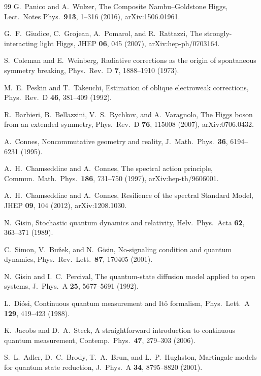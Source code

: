 \documentclass[aps,pra,onecolumn,superscriptaddress,nofootinbib,10pt]{revtex4-2}
\theoremstyle{definition}
\theoremstyle{remark}
\begin{document}
\begin{thebibliography}{99}
 G.~Panico and A.~Wulzer, The Composite Nambu--Goldstone Higgs, Lect.\ Notes Phys.\ \textbf{913}, 1--316 (2016), arXiv:1506.01961.

 G.~F.~Giudice, C.~Grojean, A.~Pomarol, and R.~Rattazzi, The strongly-interacting light Higgs, JHEP \textbf{06}, 045 (2007), arXiv:hep-ph/0703164.

 S.~Coleman and E.~Weinberg, Radiative corrections as the origin of spontaneous symmetry breaking, Phys.\ Rev.\ D \textbf{7}, 1888--1910 (1973).

 M.~E.~Peskin and T.~Takeuchi, Estimation of oblique electroweak corrections, Phys.\ Rev.\ D \textbf{46}, 381--409 (1992).

 R.~Barbieri, B.~Bellazzini, V.~S.~Rychkov, and A.~Varagnolo, The Higgs boson from an extended symmetry, Phys.\ Rev.\ D \textbf{76}, 115008 (2007), arXiv:0706.0432.

 A.~Connes, Noncommutative geometry and reality, J.\ Math.\ Phys.\ \textbf{36}, 6194--6231 (1995).

 A.~H.~Chamseddine and A.~Connes, The spectral action principle, Commun.\ Math.\ Phys.\ \textbf{186}, 731--750 (1997), arXiv:hep-th/9606001.

 A.~H.~Chamseddine and A.~Connes, Resilience of the spectral Standard Model, JHEP \textbf{09}, 104 (2012), arXiv:1208.1030.

 N.~Gisin, Stochastic quantum dynamics and relativity, Helv.\ Phys.\ Acta \textbf{62}, 363--371 (1989).

 C.~Simon, V.~Bu\v{z}ek, and N.~Gisin, No-signaling condition and quantum dynamics, Phys.\ Rev.\ Lett.\ \textbf{87}, 170405 (2001).

 N.~Gisin and I.~C.~Percival, The quantum-state diffusion model applied to open systems, J.\ Phys.\ A \textbf{25}, 5677--5691 (1992).

 L.~Di\'osi, Continuous quantum measurement and It\^o formalism, Phys.\ Lett.\ A \textbf{129}, 419--423 (1988).

 K.~Jacobs and D.~A.~Steck, A straightforward introduction to continuous quantum measurement, Contemp.\ Phys.\ \textbf{47}, 279--303 (2006).

 S.~L.~Adler, D.~C.~Brody, T.~A.~Brun, and L.~P.~Hughston, Martingale models for quantum state reduction, J.\ Phys.\ A \textbf{34}, 8795--8820 (2001).


\end{thebibliography}
\end{document}
